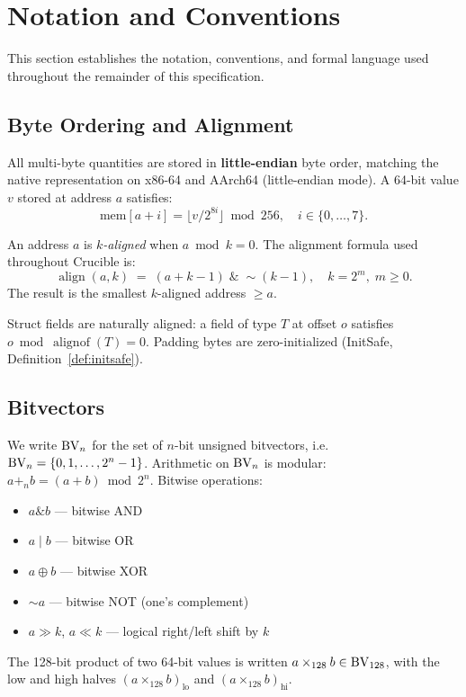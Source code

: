 
\section{Notation and Conventions}

This section establishes the notation, conventions, and formal language
used throughout the remainder of this specification.

\subsection{Byte Ordering and Alignment}

All multi-byte quantities are stored in \textbf{little-endian} byte order,
matching the native representation on x86-64 and AArch64 (little-endian mode).
A 64-bit value $v$ stored at address $a$ satisfies:
\[
  \text{mem}[a + i] = \bigl\lfloor v / 2^{8i} \bigr\rfloor \bmod 256,
  \quad i \in \{0,\dots,7\}.
\]

\begin{definition}[Alignment]
\label{def:alignment}
An address $a$ is \emph{$k$-aligned} when $a \bmod k = 0$.
The alignment formula used throughout Crucible is:
\[
  \operatorname{align}(a, k) \;=\; (a + k - 1) \;\mathbin{\&}\; {\sim}(k-1),
  \quad k = 2^m,\; m \ge 0.
\]
The result is the smallest $k$-aligned address $\ge a$.
\end{definition}

Struct fields are naturally aligned: a field of type $T$ at offset
$o$ satisfies $o \bmod \operatorname{alignof}(T) = 0$.
Padding bytes are zero-initialized (InitSafe, Definition~\ref{def:initsafe}).

\subsection{Bitvectors}

We write $\mathrm{BV}_{n}$ for the set of $n$-bit unsigned bitvectors,
i.e.\ $\mathrm{BV}_{n} = \{0, 1, \dots, 2^n - 1\}$.
Arithmetic on $\mathrm{BV}_{n}$ is modular: $a +_n b = (a + b) \bmod 2^n$.
Bitwise operations:
\begin{itemize}
  \item $a \mathbin{\&} b$ --- bitwise AND
  \item $a \mathbin{|} b$ --- bitwise OR
  \item $a \oplus b$ --- bitwise XOR
  \item ${\sim}a$ --- bitwise NOT (one's complement)
  \item $a \gg k$, $a \ll k$ --- logical right/left shift by $k$
\end{itemize}
The 128-bit product of two 64-bit values is written
$a \times_{128} b \in \mathrm{BV}_{128}$, with the low and high halves
$(a \times_{128} b)_{\text{lo}}$ and $(a \times_{128} b)_{\text{hi}}$.

